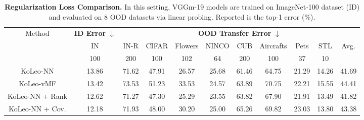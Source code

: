 \begin{table*}[t]
\centering
  \caption{\textbf{Regularization Loss Comparison.} In this setting, VGGm-19 models are trained on ImageNet-100 dataset (ID) and evaluated on 8 OOD datasets via linear probing. Reported is the top-1 error (\%).} 
  \label{tab:aux_loss}
  \centering
     \begin{tabular}{cc|ccccccccc}
     \hline %
     \multicolumn{1}{c}{Method} &
     \multicolumn{1}{c}{\textbf{ID Error} $\downarrow$} &
     \multicolumn{9}{c}{\textbf{OOD Transfer Error} $\downarrow$} \\
    & IN & IN-R & CIFAR & Flowers & NINCO & CUB & Aircrafts & Pets & STL & Avg. \\
    & 100 & 200 & 100 & 102 & 64 & 200 & 100 & 37 & 10 & \\ 
    \toprule
    KoLeo-NN & 13.86 & 71.62 & 47.91 & 26.57 & 25.68 & 61.46 & 64.75 & 21.29 & 14.26 & 41.69 \\
    KoLeo-vMF & 13.42 & 73.53 & 51.23 & 33.53 & 24.57 & 63.89 & 70.75 & 22.21 & 15.55 & 44.41 \\
    KoLeo-NN + Rank & 12.62 & 71.27 & 47.30 & 25.29 & 23.55 & 63.82 & 67.90 & 21.91 & 13.49 & 41.82 \\
    KoLeo-NN + Cov. & 12.18 & 71.93 & 48.00 & 30.20 & 25.00 & 65.26 & 69.82 & 23.03 & 13.80 & 43.38 \\
    \bottomrule
    \end{tabular}
\end{table*}
